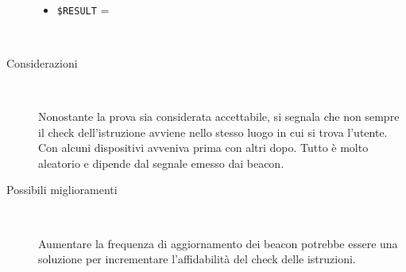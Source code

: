 \documentclass[../../SperimentazioniPratiche.tex]{subfiles}
\begin{document}
\begin{tcolorbox}[fonttitle=\bfseries, 
								adjusted title={\Large Prova 15A.1}, 
								breakable, 
								sharp corners=south,
								colback=white, 
								colframe=white!60!black]
\begin{description}[leftmargin=0.7cm,labelwidth=!]
\begin{description}
        					\item[\dispositivoC] \ \par
        					\begin{itemize}
        						\item \verb|$RESULT| = \ok
        					\end{itemize}
        					
        				\end{description}
        				
        			\tcbline
        			
        			\item[Analisi risultati] \ \par
        				\begin{description}
        					\item[Considerazioni] \ \par
        						Nonostante la prova sia considerata accettabile, si segnala che non sempre il check dell'istruzione avviene nello stesso luogo in cui si trova l'utente. Con alcuni dispositivi avveniva prima con altri dopo. Tutto è molto aleatorio e dipende dal segnale emesso dai beacon.
        					
        					\item[Possibili miglioramenti] \ \par 
        						Aumentare la frequenza di aggiornamento dei beacon potrebbe essere una soluzione per incrementare l'affidabilità del check delle istruzioni.
        				\end{description}
        				
				\end{description}  
				
			\end{tcolorbox}



	
	\newpage		
\end{document}
